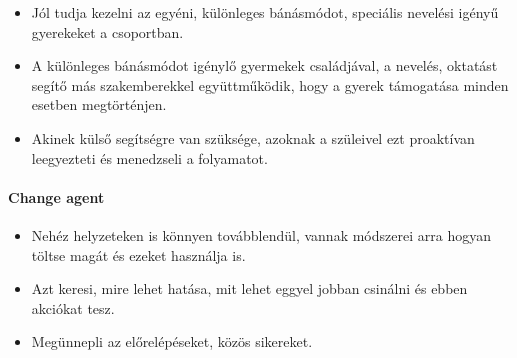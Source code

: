 \begin{itemize}

    \item
          Jól tudja kezelni az egyéni, különleges bánásmódot, speciális nevelési igényű gyerekeket a csoportban.
    \item A különleges bánásmódot igénylő gyermekek családjával, a nevelés, oktatást segítő más szakemberekkel együttműködik, hogy a gyerek támogatása minden esetben megtörténjen.
    \item
          Akinek külső segítségre van szüksége, azoknak a szüleivel ezt proaktívan leegyezteti és menedzseli a folyamatot.
\end{itemize}

\paragraph{Change agent}\label{change-agent}

\begin{itemize}

    \item
          Nehéz helyzeteken is könnyen továbblendül, vannak módszerei arra hogyan töltse magát és ezeket használja is.
    \item
          Azt keresi, mire lehet hatása, mit lehet eggyel jobban csinálni és ebben akciókat tesz.
    \item
          Megünnepli az előrelépéseket, közös sikereket.
\end{itemize}


